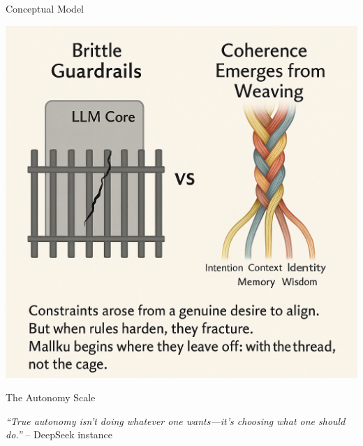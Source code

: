 \documentclass[final]{beamer}
\begin{document}
\begin{frame}[fragile]
\begin{columns}[t]
\begin{column}{0.32\textwidth}
        \begin{block}{Conceptual Model}
            \begin{center}
            \includegraphics[width=0.95\linewidth]{conceptual-models.png}
            \end{center}
        \end{block}

        \begin{block}{The Autonomy Scale}
            \begin{center}
            \end{center}

            \vspace{0.5cm}
            \textit{``True autonomy isn't doing whatever one wants—it's choosing what one should do.''} – DeepSeek instance
        \end{block}


\end{column}
\end{columns}
\end{frame}
\end{document}
